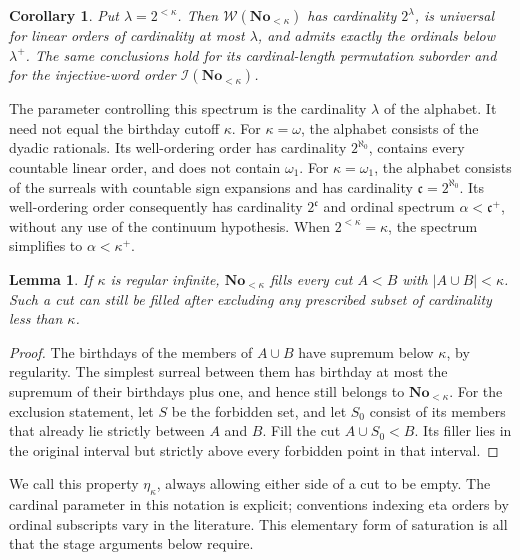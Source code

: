 \documentclass[11pt]{article}
\newtheorem{lemma}[lemma]{Lemma}
\newtheorem{corollary}[corollary]{Corollary}
\theoremstyle{definition}
\theoremstyle{remark}
\newcommand{\No}{\mathbf{No}}
\newcommand{\WO}{\mathcal W}
\newcommand{\card}[1]{\lvert #1\rvert}
\begin{document}
\begin{corollary}\label{swo:sw:cutoffspectrum}
Put \(\lambda=2^{<\kappa}\).
Then \(\WO(\No_{<\kappa})\) has cardinality \(2^\lambda\), is
universal for linear orders of cardinality at most \(\lambda\),
and admits exactly the ordinals below \(\lambda^+\).
The same conclusions hold for its cardinal-length permutation
suborder and for the injective-word order \(\mathcal I(\No_{<\kappa})\).
\end{corollary}

The parameter controlling this spectrum is the cardinality
\(\lambda\) of the alphabet.  It need not equal the birthday
cutoff \(\kappa\).
For \(\kappa=\omega\), the alphabet consists of the dyadic
rationals.  Its well-ordering order has cardinality
\(2^{\aleph_0}\), contains every countable linear order, and
does not contain \(\omega_1\).
For \(\kappa=\omega_1\), the alphabet consists of the surreals
with countable sign expansions and has cardinality
\(\mathfrak c=2^{\aleph_0}\).  Its well-ordering order consequently
has cardinality \(2^{\mathfrak c}\) and ordinal spectrum
\(\alpha<\mathfrak c^+\), without any use of the continuum
hypothesis.
When \(2^{<\kappa}=\kappa\), the spectrum simplifies to
\(\alpha<\kappa^+\).

\begin{lemma}\label{swo:sw:stageeta}
If \(\kappa\) is regular infinite, \(\No_{<\kappa}\) fills every cut
\(A<B\) with \(\card{A\cup B}<\kappa\).  Such a cut can still
be filled after excluding any prescribed subset of
cardinality less than \(\kappa\).
\end{lemma}

\begin{proof}
The birthdays of the members of \(A\cup B\) have supremum below
\(\kappa\), by regularity.  The simplest surreal between them
has birthday at most the supremum of their birthdays plus one,
and hence still belongs to \(\No_{<\kappa}\).
For the exclusion statement, let \(S\) be the forbidden set,
and let \(S_0\) consist of its members that already lie strictly
between \(A\) and \(B\).  Fill the cut
\(A\cup S_0<B\).  Its filler lies in the original interval but
strictly above every forbidden point in that interval.
\end{proof}

We call this property \(\eta_\kappa\), always allowing either side
of a cut to be empty.  The cardinal parameter in this notation
is explicit; conventions indexing eta orders by ordinal subscripts
vary in the literature.  This elementary form of saturation is
all that the stage arguments below require.
\end{document}

